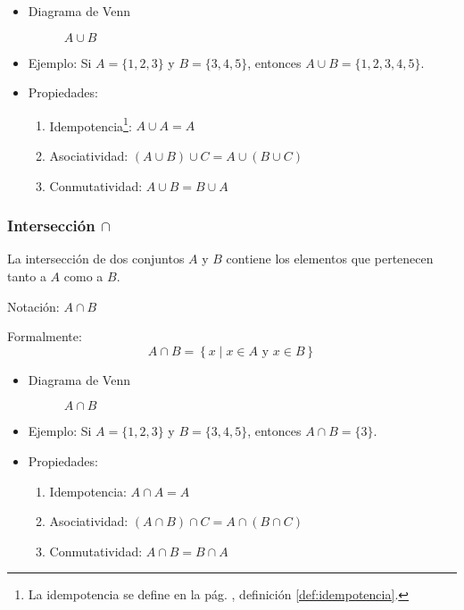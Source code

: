 \begin{itemize}
	\item Diagrama de Venn
	\begin{figure}[H]
		\centering
		\begin{venndiagram2sets}
			\fillA \fillB
		\end{venndiagram2sets}
		\caption*{$A \cup B$}
	\end{figure}
	\item Ejemplo:
	Si \(A = \{1, 2, 3\}\) y \(B = \{3, 4, 5\}\), entonces \(A \cup B = \{1, 2, 3, 4, 5\}\).
	
	\item Propiedades:
	\begin{enumerate}[label=\roman*)]
		\item Idempotencia\footnote{La idempotencia se define en la pág. \pageref{def:idempotencia}, definición \ref{def:idempotencia}.}: \( A \cup A = A \)
		\item Asociatividad: \( \left( A \cup B \right) \cup C = A \cup \left( B \cup C \right) \)
		\item Conmutatividad: \( A \cup B = B \cup A\)
	\end{enumerate}
\end{itemize}

\subsubsection{Intersección $\cap$}
\vspace{1em}
\begin{fmd-definition}[Intersección]
	La intersección de dos conjuntos \(A\) y \(B\) contiene los elementos que pertenecen tanto a \(A\) como a \(B\).
	
	Notación: \(A \cap B\)
	
	Formalmente:
	\[ A \cap B = \left\{ x \mid x \in A \mbox{ y } x \in B \right\} \]
\end{fmd-definition}

\begin{itemize}
	\item Diagrama de Venn
	\begin{figure}[H]
		\centering
		\begin{venndiagram2sets}
			\fillACapB
		\end{venndiagram2sets}
		\caption*{\(A \cap B \)}
	\end{figure}
	\item Ejemplo:
	Si \(A = \{1, 2, 3\}\) y \(B = \{3, 4, 5\}\), entonces \(A \cap B = \{3\}\).
	
	\item Propiedades:
	\begin{enumerate}[label=\roman*)]
		\item Idempotencia: \( A \cap A = A \)
		\item Asociatividad: \( \left( A \cap B \right) \cap C = A \cap \left( B \cap C \right) \)
		\item Conmutatividad: \( A \cap B = B \cap A\)
	\end{enumerate}
\end{itemize}

